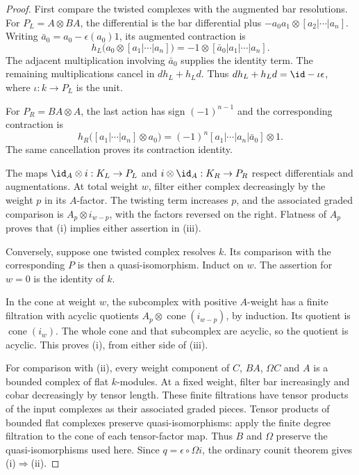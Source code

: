\begin{proof}
First compare the twisted complexes with the augmented bar resolutions.
For $P_L=A\otimes BA$, the differential is the bar differential plus
$-a_0a_1\otimes[a_2|\cdots|a_n]$.
Writing $\bar a_0=a_0-\epsilon(a_0)1$, its augmented contraction is
\[
 h_L\bigl(a_0\otimes[a_1|\cdots|a_n]\bigr)
       =-1\otimes[\bar a_0|a_1|\cdots|a_n].
\]
The adjacent multiplication involving $\bar a_0$ supplies the identity term.
The remaining multiplications cancel in $dh_L+h_Ld$.
Thus $dh_L+h_Ld=\id-\iota\epsilon$, where $\iota:k\to P_L$ is the unit.

For $P_R=BA\otimes A$, the last action has sign $(-1)^{n-1}$ and the corresponding contraction is
\[
 h_R\bigl([a_1|\cdots|a_n]\otimes a_0\bigr)
       =(-1)^n[a_1|\cdots|a_n|\bar a_0]\otimes1.
\]
The same cancellation proves its contraction identity.

The maps $\id_A\otimes i:K_L\to P_L$ and $i\otimes\id_A:K_R\to P_R$ respect differentials and augmentations.
At total weight $w$, filter either complex decreasingly by the weight $p$ in its $A$-factor.
The twisting term increases $p$, and the associated graded comparison is $A_p\otimes i_{w-p}$, with the factors reversed on the right.
Flatness of $A_p$ proves that (i) implies either assertion in (iii).

Conversely, suppose one twisted complex resolves $k$.
Its comparison with the corresponding $P$ is then a quasi-isomorphism.
Induct on $w$.
The assertion for $w=0$ is the identity of $k$.

In the cone at weight $w$, the subcomplex with positive $A$-weight has a finite filtration with acyclic quotients $A_p\otimes\operatorname{cone}(i_{w-p})$, by induction.
Its quotient is $\operatorname{cone}(i_w)$.
The whole cone and that subcomplex are acyclic, so the quotient is acyclic.
This proves (i), from either side of (iii).

For comparison with (ii), every weight component of $C$, $BA$, $\Omega C$ and $A$ is a bounded complex of flat $k$-modules.
At a fixed weight, filter bar increasingly and cobar decreasingly by tensor length.
These finite filtrations have tensor products of the input complexes as their associated graded pieces.
Tensor products of bounded flat complexes preserve quasi-isomorphisms: apply the finite degree filtration to the cone of each tensor-factor map.
Thus $B$ and $\Omega$ preserve the quasi-isomorphisms used here.
Since $q=\epsilon\circ\Omega i$, the ordinary counit theorem gives (i)$\Rightarrow$(ii).


\end{proof}
